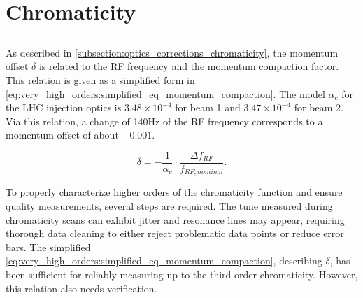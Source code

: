 \section{Chromaticity}


\subsection{}
\label{subsection:decapoles:chromaticity:measurement}

As described in \cref{subsection:optics_corrections_chromaticity}, the momentum offset $\delta$ is
related to the RF frequency and the momentum compaction factor. This relation is given as a
simplified form in \cref{eq:very_high_orders:simplified_eq_momentum_compaction}. 
The model $\alpha_c$ for the LHC injection optics is $3.48 \times 10^{-4}$ for beam 1 and $3.47
\times 10^{-4}$ for beam 2.  Via this relation, a change of 140Hz of the RF frequency corresponds to
a momentum offset of about $-0.001$.

\begin{equation}
    \delta = -\frac{1}{\alpha_c} \cdot \frac{\Delta f_{RF}}{f_{RF,nominal}}.
    \label{eq:very_high_orders:simplified_eq_momentum_compaction}
\end{equation}

%

To properly characterize higher orders of the chromaticity function and ensure quality measurements,
several steps are required. The tune measured during chromaticity scans can exhibit jitter and
resonance lines may appear, requiring thorough data cleaning to either reject problematic data
points or reduce error bars. The simplified
\cref{eq:very_high_orders:simplified_eq_momentum_compaction}, describing $\delta$, has been
sufficient for reliably measuring up to the third order chromaticity. However, this relation also
needs verification.




